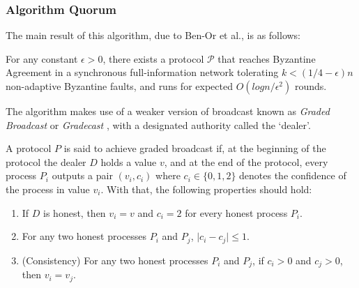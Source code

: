 \subsubsection{Algorithm Quorum\cite{BPV06}}
The main result of this algorithm, due to Ben-Or et al., is as follows:
\begin{theorem}
For any constant $\epsilon > 0$, there exists a protocol $\mathcal{P}$ that reaches Byzantine Agreement in a synchronous full-information network tolerating $k < (1/4 - \epsilon) n$ non-adaptive Byzantine faults, and runs for expected $O(logn/\epsilon^2)$ rounds. 
\end{theorem}
The algorithm makes use of a weaker version of broadcast known as \textit{Graded Broadcast} or \textit{Gradecast} \cite{FM97}, with a designated authority called the `dealer'.
\begin{definition}
A protocol $P$ is said to achieve graded broadcast if, at the beginning of the protocol the dealer $D$ holds a value $v$, and at the end of the protocol, every process $P_i$ outputs a pair $(v_i, c_i)$ where $c_i \in \{0, 1, 2\}$ denotes the confidence of the process in value $v_i$. With that, the following properties should hold:
\begin{enumerate}
\item If $D$ is honest, then $v_i = v$ and $c_i = 2$ for every honest process $P_i$. 
\item For any two honest processes $P_i$ and $P_j$, $\mid c_i - c_j \mid \leq 1$.
\item (Consistency) For any two honest processes $P_i$ and $P_j$, if $c_i > 0$ and $c_j > 0$, then $v_i = v_j$.
\end{enumerate}
\end{definition}

